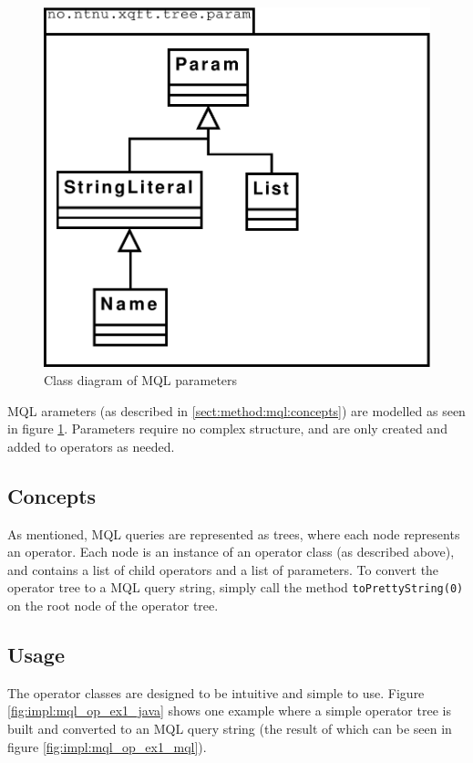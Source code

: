 \begin{figure}[!htp]
\begin{center}
  \includegraphics[scale=0.4]{diagrams/mql_param_uml}
  \caption{Class diagram of MQL parameters}
  \label{fig:impl:mql_param_uml}
\end{center}
\end{figure}

MQL arameters (as described in \ref{sect:method:mql:concepts}) are modelled as
seen in figure \ref{fig:impl:mql_param_uml}. Parameters require no complex
structure, and are only created and added to operators as needed.

\subsection{Concepts}
As mentioned, MQL queries are represented as trees, where each node represents
an operator. Each node is an instance of an operator class (as described
above), and contains a list of child operators and a list of parameters. To
convert the operator tree to a MQL query string, simply call the method
\texttt{toPrettyString(0)} on the root node of the operator tree.

\subsection{Usage}
The operator classes are designed to be intuitive and simple to use. Figure
\ref{fig:impl:mql_op_ex1_java} shows one example where a simple operator tree
is built and converted to an MQL query string (the result of which can be seen
in figure \ref{fig:impl:mql_op_ex1_mql}).

